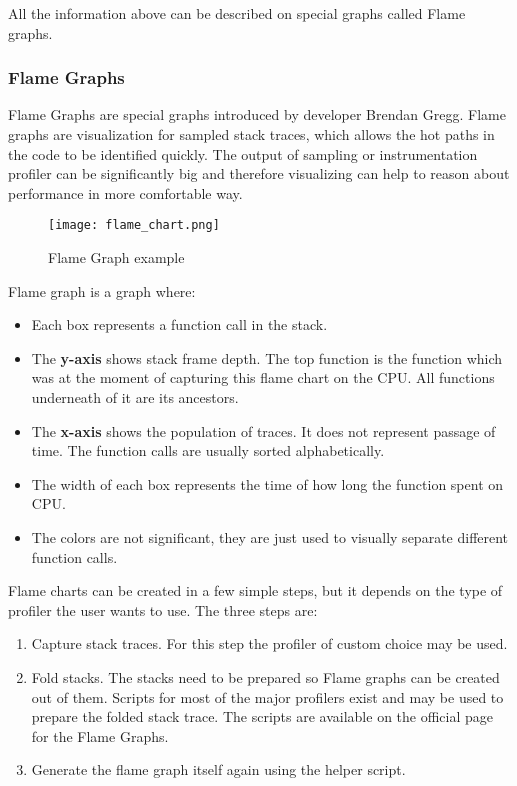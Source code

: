 All the information above can be described on special graphs called Flame graphs.
\subsubsection{Flame Graphs}
Flame Graphs are special graphs introduced by developer Brendan Gregg. Flame graphs are visualization for sampled stack traces, which allows the hot paths in the code to be identified quickly. The output of sampling or instrumentation profiler can be significantly big and therefore visualizing can help to reason about performance in more comfortable way. 

\begin{figure}
	\centering
	\texttt{[image: flame\_chart.png]}
	\caption{Flame Graph example}
	\label{fig:flame_chart}
\end{figure}
Flame graph is a graph where:
\begin{itemize}
	\item Each box represents a function call in the stack.
	\item The \textbf{y-axis} shows stack frame depth. The top function is the function which was at the moment of capturing this flame chart on the CPU. All functions underneath of it are its ancestors.
	\item The \textbf{x-axis} shows the population of traces. It does not represent passage of time. The function calls are usually sorted alphabetically.
	\item The width of each box represents the time of how long the function spent on CPU.
	\item The colors are not significant, they are just used to visually separate different function calls.
\end{itemize}

Flame charts can be created in a few simple steps, but it depends on the type of profiler the user wants to use. The three steps are:
\begin{enumerate}
	\item Capture stack traces. For this step the profiler of custom choice may be used.
	\item Fold stacks. The stacks need to be prepared so Flame graphs can be created out of them. Scripts for most of the major profilers exist and may be used to prepare the folded stack trace. The scripts are available on the official page for the Flame Graphs.
	\item Generate the flame graph itself again using the helper script.
\end{enumerate}


